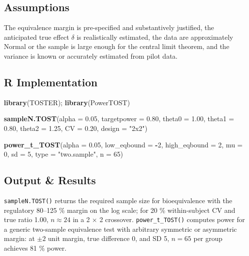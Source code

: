 \documentclass[
]{article}
\newenvironment{Shaded}{\begin{snugshade}}{\end{snugshade}}
\newcommand{\AttributeTok}[1]{\textcolor[rgb]{0.13,0.29,0.53}{#1}}
\newcommand{\DecValTok}[1]{\textcolor[rgb]{0.00,0.00,0.81}{#1}}
\newcommand{\FloatTok}[1]{\textcolor[rgb]{0.00,0.00,0.81}{#1}}
\newcommand{\FunctionTok}[1]{\textcolor[rgb]{0.13,0.29,0.53}{\textbf{#1}}}
\newcommand{\NormalTok}[1]{#1}
\newcommand{\SpecialCharTok}[1]{\textcolor[rgb]{0.81,0.36,0.00}{\textbf{#1}}}
\newcommand{\StringTok}[1]{\textcolor[rgb]{0.31,0.60,0.02}{#1}}
\begin{document}
\subsection{Assumptions}\label{assumptions}

The equivalence margin is pre-specified and substantively justified, the
anticipated true effect \(\delta\) is realistically estimated, the data
are approximately Normal or the sample is large enough for the central
limit theorem, and the variance is known or accurately estimated from
pilot data.

\subsection{R Implementation}\label{r-implementation}

\begin{Shaded}
\begin{Highlighting}[]
\FunctionTok{library}\NormalTok{(TOSTER); }\FunctionTok{library}\NormalTok{(PowerTOST)}

\FunctionTok{sampleN.TOST}\NormalTok{(}\AttributeTok{alpha =} \FloatTok{0.05}\NormalTok{, }\AttributeTok{targetpower =} \FloatTok{0.80}\NormalTok{,}
             \AttributeTok{theta0 =} \FloatTok{1.00}\NormalTok{, }\AttributeTok{theta1 =} \FloatTok{0.80}\NormalTok{, }\AttributeTok{theta2 =} \FloatTok{1.25}\NormalTok{,}
             \AttributeTok{CV =} \FloatTok{0.20}\NormalTok{, }\AttributeTok{design =} \StringTok{"2x2"}\NormalTok{)}

\FunctionTok{power\_t\_TOST}\NormalTok{(}\AttributeTok{alpha =} \FloatTok{0.05}\NormalTok{, }\AttributeTok{low\_eqbound =} \SpecialCharTok{{-}}\DecValTok{2}\NormalTok{, }\AttributeTok{high\_eqbound =} \DecValTok{2}\NormalTok{,}
             \AttributeTok{mu =} \DecValTok{0}\NormalTok{, }\AttributeTok{sd =} \DecValTok{5}\NormalTok{, }\AttributeTok{type =} \StringTok{"two.sample"}\NormalTok{, }\AttributeTok{n =} \DecValTok{65}\NormalTok{)}
\end{Highlighting}
\end{Shaded}

\subsection{Output \& Results}\label{output-results}

\texttt{sampleN.TOST()} returns the required sample size for
bioequivalence with the regulatory 80--125 \% margin on the log scale;
for 20 \% within-subject CV and true ratio 1.00, \(n \approx 24\) in a 2
× 2 crossover. \texttt{power\_t\_TOST()} computes power for a generic
two-sample equivalence test with arbitrary symmetric or asymmetric
margin: at \(\pm 2\) unit margin, true difference 0, and SD 5,
\(n = 65\) per group achieves 81 \% power.
\end{document}
